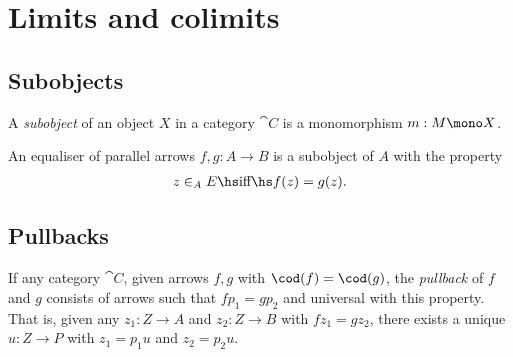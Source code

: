 \documentclass{article}
\begin{document}
\section{Limits and colimits}

\subsection{Subobjects}

\begin{definition}[Awodey p. 89]
	A \emph{subobject} of an object $X$ in a category $\cat C$ is
	a monomorphism $m:M\mono X$.
\end{definition}

\begin{corollary}
	An equaliser of parallel arrows $f,g:A\to B$ is a subobject
	of $A$ with the property
	\begin{align*}
		z\in_A E \hs\text{iff}\hs f(z) = g(z).
	\end{align*}
\end{corollary}

\subsection{Pullbacks}

\begin{definition}[Awodey p. 92]
	If any category $\cat C$, given arrows $f,g$ with $\cod(f)=\cod(g)$,
	the \emph{pullback} of $f$ and $g$ consists of arrows such that $fp_1=gp_2$
	and universal with this property. That is, given any $z_1:Z\to A$ and
	$z_2:Z\to B$ with $fz_1=gz_2$, there exists a unique $u:Z\to P$ with
	$z_1=p_1u$ and $z_2=p_2u$.
	\begin{center}
	\end{center}
\end{definition}
\end{document}
